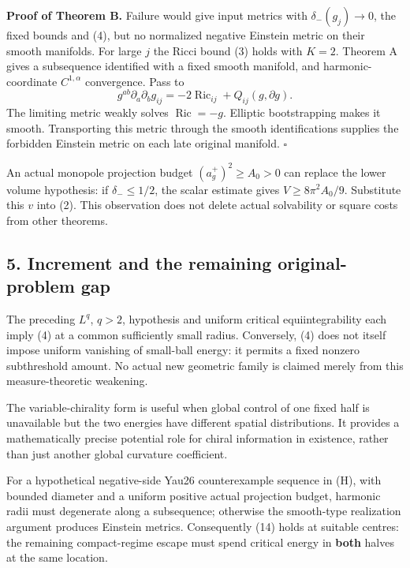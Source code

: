 \documentclass[
  11pt,
]{article}
\begin{document}
\textbf{Proof of Theorem B.} Failure would give input metrics with
\(\delta_-(g_j)\to0\), the fixed bounds and (4), but no normalized
negative Einstein metric on their smooth manifolds. For large \(j\) the
Ricci bound (3) holds with \(K=2\). Theorem A gives a subsequence
identified with a fixed smooth manifold, and harmonic-coordinate
\(C^{1,\alpha}\) convergence. Pass to \[
 g^{ab}\partial_a\partial_bg_{ij}
    =-2\operatorname{Ric}_{ij}+Q_{ij}(g,\partial g).
\] The limiting metric weakly solves \(\operatorname{Ric}=-g\). Elliptic
bootstrapping makes it smooth. Transporting this metric through the
smooth identifications supplies the forbidden Einstein metric on each
late original manifold. \(\square\)

An actual monopole projection budget \((a_g^+)^2\ge A_0>0\) can replace
the lower volume hypothesis: if \(\delta_-\le1/2\), the scalar estimate
gives \(V\ge8\pi^2A_0/9\). Substitute this \(v\) into (2). This
observation does not delete actual solvability or square costs from
other theorems.

\hypertarget{increment-and-the-remaining-original-problem-gap}{%
\subsection{5. Increment and the remaining original-problem
gap}\label{increment-and-the-remaining-original-problem-gap}}

The preceding \(L^q\), \(q>2\), hypothesis and uniform critical
equiintegrability each imply (4) at a common sufficiently small radius.
Conversely, (4) does not itself impose uniform vanishing of small-ball
energy: it permits a fixed nonzero subthreshold amount. No actual new
geometric family is claimed merely from this measure-theoretic
weakening.

The variable-chirality form is useful when global control of one fixed
half is unavailable but the two energies have different spatial
distributions. It provides a mathematically precise potential role for
chiral information in existence, rather than just another global
curvature coefficient.

For a hypothetical negative-side Yau26 counterexample sequence in (H),
with bounded diameter and a uniform positive actual projection budget,
harmonic radii must degenerate along a subsequence; otherwise the
smooth-type realization argument produces Einstein metrics. Consequently
(14) holds at suitable centres: the remaining compact-regime escape must
spend critical energy in \textbf{both} halves at the same location.
\end{document}
